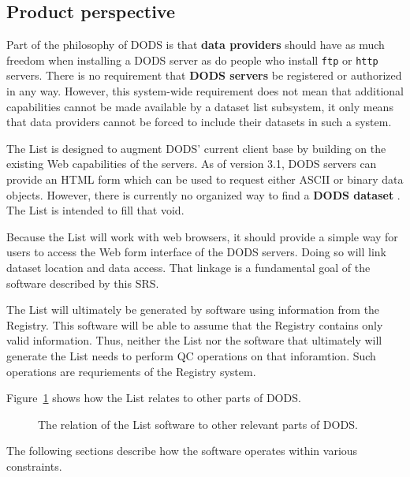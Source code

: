 \documentclass{article}
\begin{document}
\subsection{Product perspective}

Part of the philosophy of \acs{DODS} is that \textbf{data providers}
 should have as much freedom when installing a
\acs{DODS} server as do people who install {\tt ftp} or {\tt http} servers.
There is no requirement that \textbf{\acs{DODS} servers}
 be registered or authorized in any way.  However,
this system-wide requirement does not mean that additional capabilities
cannot be made available by a dataset list subsystem, it only means that data
providers cannot be forced to include their datasets in such a system.

The List is designed to augment \acs{DODS}' current client base by building
on the existing Web capabilities of the servers. As of version 3.1,
\acs{DODS} servers can provide an HTML form\cite{gallagher:HTMLform} which
can be used to request either ASCII or binary data objects. However, there is
currently no organized way to find a \textbf{\acs{DODS} dataset}
.  The List is intended to fill that void.

Because the List will work with web browsers, it should provide a simple way
for users to access the Web form interface of the \acs{DODS} servers. Doing
so will link dataset location and data access. That linkage is a fundamental
goal of the software described by this \ac{SRS}.

The List will ultimately be generated by software using information from the
Registry. This software will be able to assume that the Registry contains
only valid information. Thus, neither the List nor the software that
ultimately will generate the List needs to perform QC operations on that
inforamtion. Such operations are requriements of the Registry system.

Figure~\ref{fig:prod-perspective} shows how the List relates
to other parts of \acs{DODS}.

\begin{figure}
\begin{center}
\end{center}
\caption{The relation of the List software to other relevant parts
  of DODS.}
\label{fig:prod-perspective}
\end{figure}

The following sections describe how the software operates within various
constraints.
\end{document}
